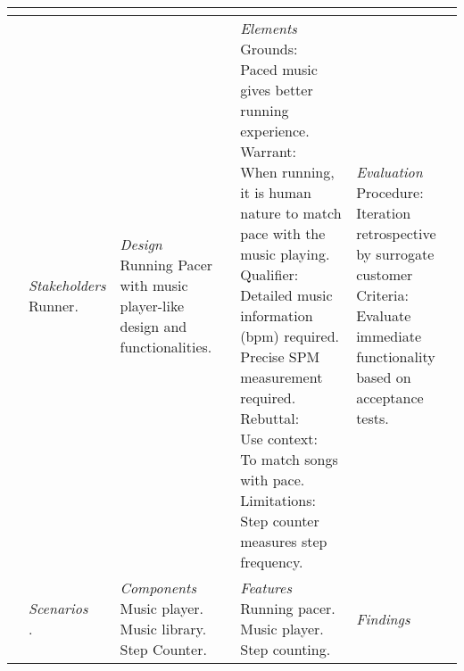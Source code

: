\begin{table}
\begin{tabular}{l|l|l|l|l}
{   } \\ \hline
\parbox[t][5cm][c]{0.02\textwidth}{}
	& \parbox[t]{0.20\textwidth}{\small 
    \textit{Stakeholders} \newline
    Runner.
	}
	& \parbox[t]{0.20\textwidth}{\small 
		\textit{Design} \newline
	 	Running Pacer with music player-like design and functionalities.  
	}
	& \parbox[t]{0.20\textwidth}{\tiny
		\textit{\small  Elements} \newline
		Grounds: \newline
		Paced music gives better running experience. \newline
		Warrant: \newline
		When running, it is human nature to match pace with the music playing. \newline
		Qualifier: \newline
		Detailed music information (bpm) required. Precise SPM measurement required. \newline
		Rebuttal: \newline
		Use context: \newline
		To match songs with pace. \newline
		Limitations: \newline
		Step counter measures step frequency.
	}
	& \parbox[t]{0.20\textwidth}{\small 
		\textit{Evaluation} \newline
		Procedure: \newline Iteration retrospective by surrogate customer \newline
		Criteria: \newline Evaluate immediate functionality based on acceptance tests.
	}\\ \hline
\parbox[t][3.5cm][c]{0.02\textwidth}{}
	& \parbox[t]{0.20\textwidth}{\small 
		\textit{Scenarios}\newline
		.
	}
	& \parbox[t]{0.20\textwidth}{\small 
		\textit{Components}\newline
		Music player. \newline
		Music library. \newline
		Step Counter.
		
	}
	& \parbox[t]{0.20\textwidth}{\small 
		\textit{Features}\newline
		Running pacer.\newline
		Music player.\newline
		Step counting.
	}
	& \parbox[t]{0.20\textwidth}{\small 
		\textit{Findings}
	}\\ \hline     
\end{tabular}
\end{table}